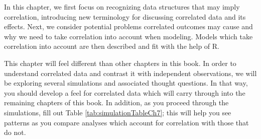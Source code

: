 \documentclass[
]{krantz}
\begin{document}
In this chapter, we first focus on recognizing data structures that may imply correlation, introducing new terminology for discussing correlated data and its effects. Next, we consider potential problems correlated outcomes may cause and why we need to take correlation into account when modeling. Models which take correlation into account are then described and fit with the help of R.

This chapter will feel different than other chapters in this book. In order to understand correlated data and contrast it with independent observations, we will be exploring several simulations and associated thought questions. In that way, you should develop a feel for correlated data which will carry through into the remaining chapters of this book. In addition, as you proceed through the simulations, fill out Table \ref{tab:simulationTableCh7}; this will help you see patterns as you compare analyses which account for correlation with those that do not.

\begin{table}

\caption{\label{tab:simulationTableCh7}Summary of simulations for Dams and Pups case study.}
\centering
{}
\end{table}
\end{document}
